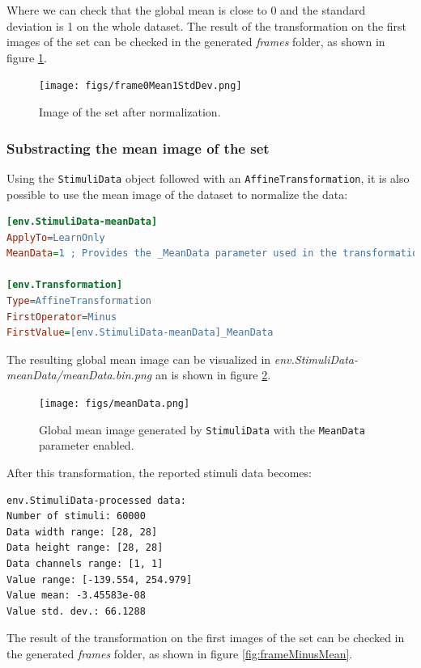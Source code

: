 \documentclass[a4paper,11pt,oneside]{article}
\begin{document}
Where we can check that the global mean is close to 0 and the standard deviation
 is 1 on the whole dataset. The result of the transformation on the first images
 of the set can be checked in the generated \emph{frames} folder, as shown in
 figure \ref{fig:frame0Mean1StdDev}.

\begin{figure}[!htb]
  \centering
  \texttt{[image: figs/frame0Mean1StdDev.png]}
  \caption{Image of the set after normalization.}
  \label{fig:frame0Mean1StdDev}
\end{figure}


\subsubsection{Substracting the mean image of the set}

Using the \lstinline!StimuliData! object followed with an
\lstinline!AffineTransformation!, it is also possible to use the mean image of
 the dataset to normalize the data:
\begin{lstlisting}[language=ini]
[env.StimuliData-meanData]
ApplyTo=LearnOnly
MeanData=1 ; Provides the _MeanData parameter used in the transformation

[env.Transformation]
Type=AffineTransformation
FirstOperator=Minus
FirstValue=[env.StimuliData-meanData]_MeanData
\end{lstlisting}

The resulting global mean image can be visualized in
 \emph{env.StimuliData-meanData/meanData.bin.png} an is shown in figure
 \ref{fig:meanData}.

\begin{figure}[ht!]
  \centering
  \texttt{[image: figs/meanData.png]}
  \caption{Global mean image generated by \lstinline!StimuliData! with
  the \lstinline!MeanData! parameter enabled.}
  \label{fig:meanData}
\end{figure}

After this transformation, the reported stimuli data becomes:
\begin{lstlisting}[style=console]
env.StimuliData-processed data:
Number of stimuli: 60000
Data width range: [28, 28]
Data height range: [28, 28]
Data channels range: [1, 1]
Value range: [-139.554, 254.979]
Value mean: -3.45583e-08
Value std. dev.: 66.1288
\end{lstlisting}

The result of the transformation on the first images of the set can be checked
 in the generated \emph{frames} folder, as shown in figure
  \ref{fig:frameMinusMean}.
\end{document}

